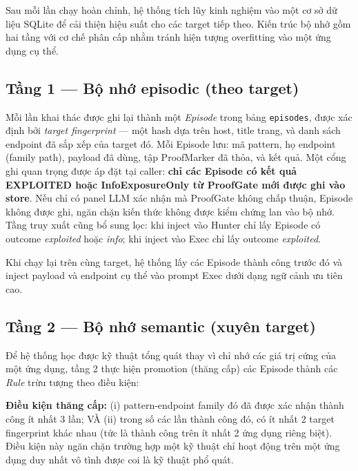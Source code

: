 Sau mỗi lần chạy hoàn chỉnh, hệ thống tích lũy kinh nghiệm vào một cơ sở dữ liệu SQLite để cải thiện hiệu suất cho các target tiếp theo. Kiến trúc bộ nhớ gồm hai tầng với cơ chế phân cấp nhằm tránh hiện tượng overfitting vào một ứng dụng cụ thể.

\subsection{Tầng 1 --- Bộ nhớ episodic (theo target)}

Mỗi lần khai thác được ghi lại thành một \textit{Episode} trong bảng \texttt{episodes}, được xác định bởi \textit{target fingerprint} --- một hash dựa trên host, title trang, và danh sách endpoint đã sắp xếp của target đó. Mỗi Episode lưu: mã pattern, họ endpoint (family path), payload đã dùng, tập ProofMarker đã thỏa, và kết quả. Một cổng ghi quan trọng được áp đặt tại caller: \textbf{chỉ các Episode có kết quả EXPLOITED hoặc InfoExposureOnly từ ProofGate mới được ghi vào store}. Nếu chỉ có panel LLM xác nhận mà ProofGate không chấp thuận, Episode không được ghi, ngăn chặn kiến thức không được kiểm chứng lan vào bộ nhớ. Tầng truy xuất cũng bổ sung lọc: khi inject vào Hunter chỉ lấy Episode có outcome \textit{exploited} hoặc \textit{info}; khi inject vào Exec chỉ lấy outcome \textit{exploited}.

Khi chạy lại trên cùng target, hệ thống lấy các Episode thành công trước đó và inject payload và endpoint cụ thể vào prompt Exec dưới dạng ngữ cảnh ưu tiên cao.

\subsection{Tầng 2 --- Bộ nhớ semantic (xuyên target)}

Để hệ thống học được kỹ thuật tổng quát thay vì chỉ nhớ các giá trị cứng của một ứng dụng, tầng 2 thực hiện promotion (thăng cấp) các Episode thành các \textit{Rule} trừu tượng theo điều kiện:

\textbf{Điều kiện thăng cấp:} (i) pattern-endpoint family đó đã được xác nhận thành công ít nhất 3 lần; VÀ (ii) trong số các lần thành công đó, có ít nhất 2 target fingerprint khác nhau (tức là thành công trên ít nhất 2 ứng dụng riêng biệt). Điều kiện này ngăn chặn trường hợp một kỹ thuật chỉ hoạt động trên một ứng dụng duy nhất vô tình được coi là kỹ thuật phổ quát.

